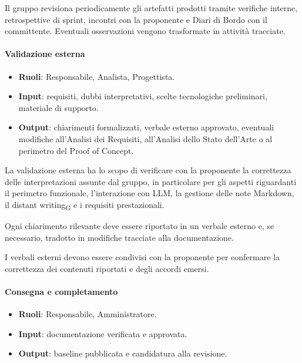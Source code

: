 Il gruppo revisiona periodicamente gli artefatti prodotti tramite verifiche interne,
retrospettive di sprint, incontri con la proponente e Diari di Bordo con il committente.
Eventuali osservazioni vengono trasformate in attività tracciate.

\paragraph{Validazione esterna}

\begin{itemize}
    \item \textbf{Ruoli}: Responsabile, Analista, Progettista.
    \item \textbf{Input}: requisiti, dubbi interpretativi, scelte tecnologiche preliminari,
    materiale di supporto.
    \item \textbf{Output}: chiarimenti formalizzati, verbale esterno approvato,
      eventuali modifiche all'Analisi dei Requisiti, all'Analisi dello Stato dell'Arte
      o al perimetro del Proof of Concept.
\end{itemize}

La validazione esterna ha lo scopo di verificare con la proponente la correttezza
delle interpretazioni assunte dal gruppo, in particolare per gli aspetti riguardanti
il perimetro funzionale, l'interazione con LLM, la gestione delle note Markdown,
il distant writing\textsubscript{G} e i requisiti prestazionali.

Ogni chiarimento rilevante deve essere riportato in un verbale esterno e, se
necessario, tradotto in modifiche tracciate alla documentazione.

I verbali esterni devono essere condivisi con la proponente per confermare la
correttezza dei contenuti riportati e degli accordi emersi.

\paragraph{Consegna e completamento}

\begin{itemize}
    \item \textbf{Ruoli}: Responsabile, Amministratore.
    \item \textbf{Input}: documentazione verificata e approvata.
    \item \textbf{Output}: baseline pubblicata e candidatura alla revisione.
\end{itemize}

